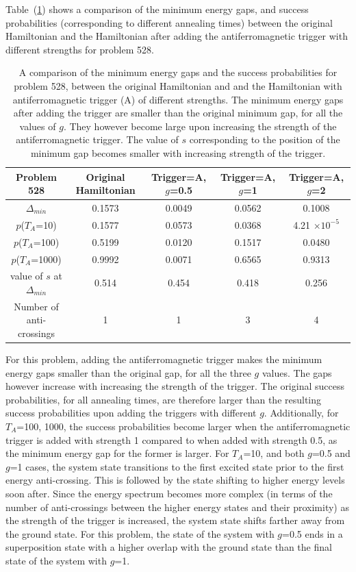 \documentclass[../main.tex]{subfiles}
\begin{document}
Table~(\ref{tab:a3}) shows a comparison of the minimum energy gaps, and success probabilities (corresponding to different annealing times) between the original Hamiltonian and the Hamiltonian after adding the antiferromagnetic trigger with different strengths for problem 528. 

\begin{table}[H]
\centering
\renewcommand{\arraystretch}{1.5}
\begin{tabular}{|c|c|c|c|c|}
\hline 
Problem 528 & Original Hamiltonian & Trigger=A, $g$=0.5 & Trigger=A, $g$=1 & Trigger=A, $g$=2 \\ 
\hline 
$\Delta_{min}$ & 0.1573 & 0.0049 & 0.0562 & 0.1008 \\ 
\hline 
$p$($T_A$=10) & 0.1577 & 0.0573 & 0.0368 & 4.21 $\times 10^{-5}$\\ 
\hline 
$p$($T_A$=100) & 0.5199 & 0.0120 & 0.1517 & 0.0480 \\ 
\hline 
$p$($T_A$=1000) & 0.9992 & 0.0071 & 0.6565 & 0.9313 \\ 
\hline 
value of $s$ at $\Delta_{min}$ & 0.514 & 0.454 & 0.418 & 0.256 \\ 
\hline 
Number of anti-crossings & 1 & 1 & 3 & 4 \\
\hline
\end{tabular} 
\caption{A comparison of the minimum energy gaps and the success probabilities for problem 528, between the original Hamiltonian and and the Hamiltonian with antiferromagnetic trigger (A) of different strengths. The minimum energy gaps after adding the trigger are smaller than the original minimum gap, for all the values of $g$. They however become large upon increasing the strength of the antiferromagnetic trigger. The value of $s$ corresponding to the position of the minimum gap becomes smaller with increasing strength of the trigger.}
\label{tab:a3}
\end{table}

For this problem, adding the antiferromagnetic trigger makes the minimum energy gaps smaller than the original gap, for all the three $g$ values. The gaps however increase with increasing the strength of the trigger. The original success probabilities, for all annealing times, are therefore larger than the resulting success probabilities upon adding the triggers with different $g$. Additionally, for $T_A$=100, 1000, the success probabilities become larger when the antiferromagnetic trigger is added with strength 1 compared to when added with strength 0.5, as the minimum energy gap for the former is larger. For $T_A$=10, and both $g$=0.5 and $g$=1 cases, the system state transitions to the first excited state prior to the first energy anti-crossing. This is followed by the state shifting to higher energy levels soon after. Since the energy spectrum becomes more complex (in terms of the number of anti-crossings between the higher energy states and their proximity) as the strength of the trigger is increased, the system state shifts farther away from the ground state. For this problem, the state of the system with $g$=0.5 ends in a superposition state with a higher overlap with the ground state than the final state of the system with $g$=1.
\end{document}
